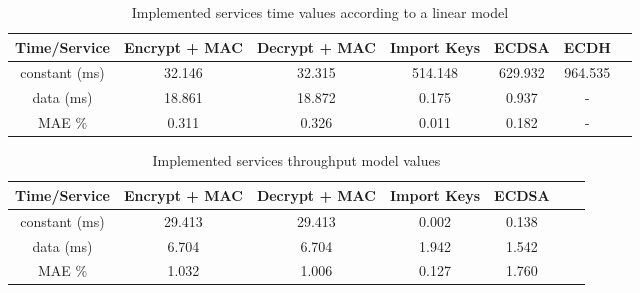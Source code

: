 \begin{table}[h!]
\centering
\def\arraystretch{1.5}
\begin{tabular}{|c|c|c|c|c|c|c|}
\hline
Time/Service   & Encrypt + MAC	  & Decrypt + MAC  & Import Keys & ECDSA & ECDH   \\ \hline
	constant (ms) & 32.146 & 32.315 & 514.148  & 629.932 & 964.535 \\ \hline
	data (ms) & 18.861 & 18.872 & 0.175 & 0.937 & - \\ \hline
	MAE \%	   & 0.311 & 0.326 & 0.011 & 0.182 & - \\ \hline
\end{tabular}
\caption{Implemented services time values according to a linear model}
\label{tab:services-model}
\end{table}

\begin{table}[]
\centering
\def\arraystretch{1.5}
\begin{tabular}{|c|c|c|c|c|c|c|}
\hline
Time/Service   & Encrypt + MAC	  & Decrypt + MAC  & Import Keys & ECDSA   \\ \hline
	constant (ms) & 29.413 & 29.413 & 0.002 & 0.138 \\ \hline
	data (ms) & 6.704 & 6.704 & 1.942 & 1.542 \\ \hline
	MAE \%	   & 1.032 & 1.006 & 0.127 & 1.760 \\ \hline
\end{tabular}
\caption{Implemented services throughput model values}
\label{tab:services-model}
\end{table}


